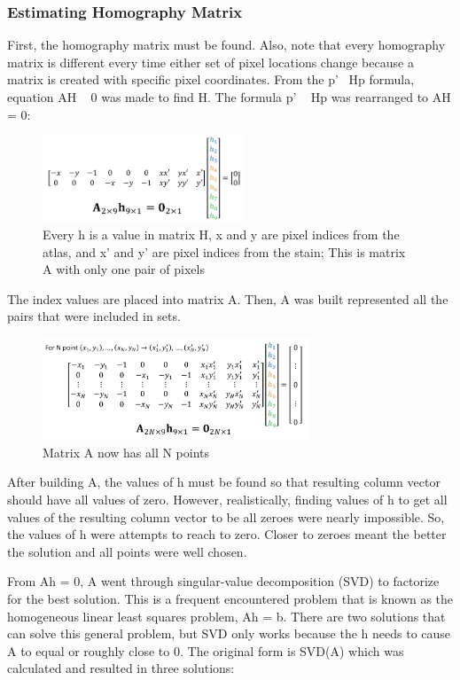 \documentclass[10pt,twocolumn]{article}
\begin{document}
\subsubsection{Estimating Homography Matrix}
First, the homography matrix must be found. Also, note that every homography matrix is different every time either set of pixel locations change because a matrix is created with specific pixel coordinates. From the p'~ Hp formula, equation AH ~ 0 was made to find H. The formula p' ~ Hp was rearranged to AH = 0:
\begin{figure}[htp]
    \centering
    \includegraphics[width=6cm]{AH.png}
    \caption{Every h is a value in matrix H, x and y are pixel indices from the atlas, and x' and y' are pixel indices from the stain; This is matrix A with only one pair of pixels}
\end{figure}
The index values are placed into matrix A. Then, A was built represented all the pairs that were included in sets. 
\begin{figure}[htp]
    \centering
    \includegraphics[width=8cm]{AN.png}
    \caption{Matrix A now has all N points}
\end{figure}
After building A, the values of h must be found so that resulting column vector should have all values of zero. However, realistically, finding values of h to get all values of the resulting column vector to be all zeroes were nearly impossible. So, the values of h were attempts to reach to zero. Closer to zeroes meant the better the solution and all points were well chosen.

From Ah = 0, A went through singular-value decomposition (SVD) to factorize for the best solution. This is a frequent encountered problem that is known as the homogeneous linear least squares problem, Ah = b. There are two solutions that can solve this general problem, but SVD only works because the h needs to cause A to equal or roughly close to 0. \cite{lect_B} The original form is SVD(A) which was calculated and resulted in three solutions: 
\end{document}
